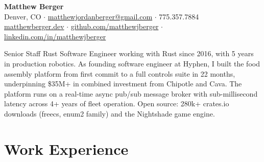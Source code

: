 \documentclass[11pt,letterpaper]{article}
\begin{document}
\begin{center}
  {\LARGE \textbf{Matthew Berger}} \\[4pt]
  Denver, CO $\cdot$
  \href{mailto:matthewjordanberger@gmail.com}{matthewjordanberger@gmail.com} $\cdot$
  775.357.7884 \\
  \href{https://matthewberger.dev}{matthewberger.dev} $\cdot$
  \href{https://github.com/matthewjberger}{github.com/matthewjberger} $\cdot$
  \href{https://linkedin.com/in/matthewjberger}{linkedin.com/in/matthewjberger}
\end{center}

\vspace{2pt}

Senior Staff Rust Software Engineer working with Rust since 2016, with 5 years in production robotics. As founding software engineer at Hyphen, I built the food assembly platform from first commit to a full controls suite in 22 months, underpinning \$35M+ in combined investment from Chipotle and Cava. The platform runs on a real-time async pub/sub message broker with sub-millisecond latency across 4+ years of fleet operation. Open source: 280k+ crates.io downloads (freecs, enum2 family) and the Nightshade game engine.

\section*{Work Experience}
\end{document}
